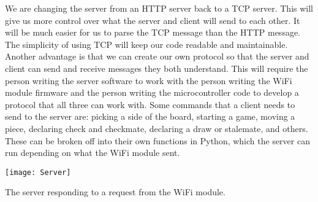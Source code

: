 \documentclass{article}
\begin{document}
We are changing the server from an HTTP server back to a TCP server. This will give us more control over what the server and client will send to each other. It will be much easier for us to parse the TCP message than the HTTP message. The simplicity of using TCP will keep our code readable and maintainable. Another advantage is that we can create our own protocol so that the server and client can send and receive messages they both understand. This will require the person writing the server software to work with the person writing the WiFi module firmware and the person writing the microcontroller code to develop a protocol that all three can work with. Some commands that a client needs to send to the server are: picking a side of the board, starting a game, moving a piece, declaring check and checkmate, declaring a draw or stalemate, and others. These can be broken off into their own functions in Python, which the server can run depending on what the WiFi module sent.

\centerline{\texttt{[image: Server]}}

\begin{center}
The server responding to a request from the WiFi module.
\end{center}
\end{document}
